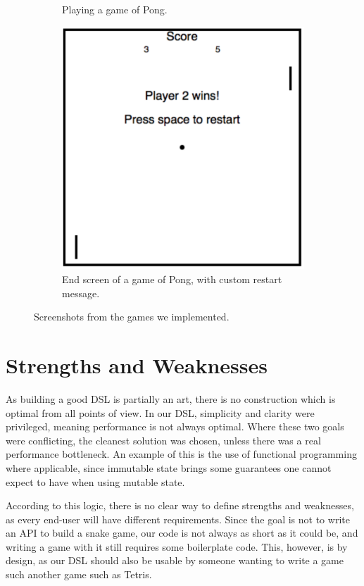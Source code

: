 \documentclass[journal,onecolumn, 9pt]{IEEEtran}
\theoremstyle{definition}
\begin{document}
\begin{figure}
{\begin{subfigure}[t]{0.32\textwidth}
		\caption{Playing a game of Pong.}
		\label{fig:sc4}
	\end{subfigure}
	\quad
	\begin{subfigure}[t]{0.32\textwidth}   
		\centering 
		\includegraphics[width=\textwidth]{img/pong_end.png}
		\caption{End screen of a game of Pong, with custom restart message.}
		\label{fig:sc5}
	\end{subfigure}
	\hfill}
	\caption{Screenshots from the games we implemented.} 
	\label{fig:screenshots}
\end{figure}

\section{Strengths and Weaknesses}
\label{sec:evaluation}
As building a good DSL is partially an art, there is no construction which is optimal from all points of view.
In our DSL, simplicity and clarity were privileged, meaning performance is not always optimal.
Where these two goals were conflicting, the cleanest solution was chosen, unless there was a real performance bottleneck.
An example of this is the use of functional programming where applicable, since immutable state brings some guarantees one cannot expect to have when using mutable state.

According to this logic, there is no clear way to define strengths and weaknesses, as every end-user will have different requirements.
Since the goal is not to write an API to build a snake game, our code is not always as short as it could be, and writing a game with it still requires some boilerplate code.
This, however, is by design, as our DSL should also be usable by someone wanting to write a game such another game such as Tetris.
\end{document}

